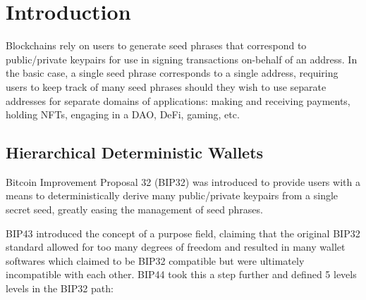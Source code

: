 \documentclass[12pt, a4paper, twocolumn]{article}
\begin{document}




\section{Introduction}

Blockchains rely on users to generate seed phrases that correspond to public/private keypairs for use in signing transactions on-behalf of an address. In the basic case, a single seed phrase corresponds to a single address, requiring users to keep track of many seed phrases should they wish to use separate addresses for separate domains of applications: making and receiving payments, holding NFTs, engaging in a DAO, DeFi, gaming, etc.


\subsection{Hierarchical Deterministic Wallets}


Bitcoin Improvement Proposal 32 (BIP32) was introduced to provide users with a means to deterministically derive many public/private keypairs from a single secret seed, greatly easing the management of seed phrases.

BIP43 introduced the concept of a purpose field, claiming that the original BIP32 standard allowed for too many degrees of freedom and resulted in many wallet softwares which claimed to be BIP32 compatible but were ultimately incompatible with each other. BIP44 took this a step further and defined 5 levels levels in the BIP32 path:
\end{document}
